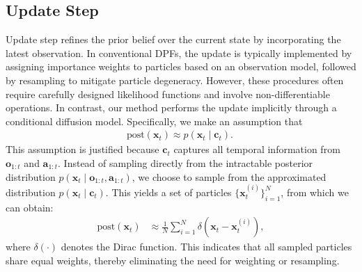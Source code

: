 \subsection{Update Step} \label{subsec:fusion}

Update step refines the prior belief over the current state by incorporating the latest observation. 
In conventional DPFs, the update is typically implemented by assigning importance weights to particles based on an observation model, followed by resampling to mitigate particle degeneracy. However, these procedures often require carefully designed likelihood functions and involve non-differentiable operations.
In contrast, our method performs the update implicitly through a conditional diffusion model. Specifically, we make an assumption that
\begin{equation} 
    \begin{aligned}
          \text{post}(\bm x_t) \approx p(\bm{x}_t \mid \bm{c}_{t}).\ 
    \end{aligned}
\end{equation}
This assumption is justified because $\bm{c}_t$ captures all temporal information from $\bm{o}_{1:t}$ and $\bm{a}_{1:t}$. Instead of sampling directly from the intractable posterior distribution $p(\bm{x}_t \mid \bm{o}_{1:t}, \bm{a}_{1:t})$, we choose to sample from the approximated distribution $p(\bm{x}_t \mid \bm{c}_t)$. This yields a set of particles $\{\bm{x}_{t}^{(i)}\}_{i=1}^N$, from which we can obtain:
\begin{equation} 
    \begin{aligned}
          \text{post}(\bm x_t) & \approx \frac{1}{N} \sum_{i=1}^N \delta(\bm{x}_t - \bm{x}_t^{(i)}),
    \end{aligned}
\end{equation}
where $\delta(\cdot)$ denotes the Dirac function.
This indicates that all sampled particles share equal weights, thereby eliminating the need for weighting or resampling.

